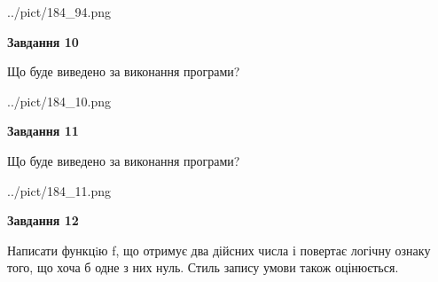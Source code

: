 \documentclass[12pt, ukrainian]{article}
\begin{document}
{\begin {large}
\begin{center}
	{../pict/184_94.png}
\end{center}
\newpage

{\begin {center}\textbf{Завдання 10}\end {center}}

Що буде виведено за виконання програми?\par
\begin{center}
	{../pict/184_10.png}
\end{center}
\newpage

{\begin {center}\textbf{Завдання 11}\end {center}}

Що буде виведено за виконання програми?\par
\begin{center}
	{../pict/184_11.png}
\end{center}
\newpage

{\begin {center}\textbf{Завдання 12}\end {center}}


Написати функцiю f, що отримує два дійсних числа і повертає логічну ознаку того, що хоча б одне з них нуль. Стиль запису умови також оцінюється.\par
\newpage

\end {large}}
\end{document}
